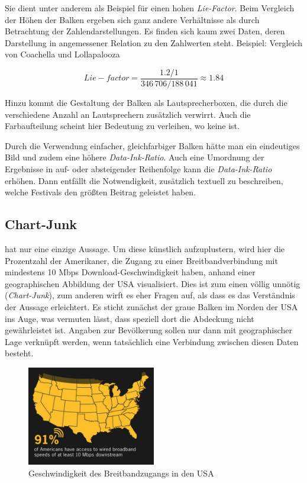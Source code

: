 \documentclass[a4paper,12pt,ngerman]{scrartcl}
\begin{document}
Sie dient unter anderem als Beispiel für einen hohen \emph{Lie-Factor}. Beim Vergleich der Höhen der Balken ergeben sich ganz andere Verhältnisse als durch Betrachtung der  Zahlendarstellungen. Es finden sich kaum zwei Daten, deren Darstellung in angemessener Relation zu den Zahlwerten steht.
Beispiel: Vergleich von Coachella und Lollapalooza

\begin{equation}
    Lie-factor = \frac{1.2 / 1}{346\,706 / 188\,041} \approx 1.84
\end{equation}

Hinzu kommt die Gestaltung der Balken als Lautsprecherboxen, die durch die verschiedene Anzahl an Lautsprechern zusätzlich verwirrt. Auch die Farbaufteilung scheint hier Bedeutung zu verleihen, wo keine ist.

Durch die Verwendung einfacher, gleichfarbiger Balken hätte man ein eindeutiges Bild und zudem eine höhere \emph{Data-Ink-Ratio}. Auch eine Umordnung der Ergebnisse in auf- oder absteigender Reihenfolge kann die \emph{Data-Ink-Ratio} erhöhen. Dann entfällt die Notwendigkeit, zusätzlich textuell zu beschreiben, welche Festivals den größten Beitrag geleistet haben.

\subsection*{Chart-Junk}

 hat nur eine einzige Aussage. Um diese künstlich aufzuplustern, wird hier die Prozentzahl der Amerikaner, die Zugang zu einer Breitbandverbindung mit mindestens 10 Mbps Download-Geschwindigkeit haben, anhand einer geographischen Abbildung der USA visualisiert. Dies ist zum einen völlig unnötig (\emph{Chart-Junk}), zum anderen wirft es eher Fragen auf, als dass es das Verständnis der Aussage erleichtert. Es sticht zunächst der graue Balken im Norden der USA ins Auge, was vermuten lässt, dass speziell dort die Abdeckung nicht gewährleistet ist. Angaben zur Bevölkerung sollen nur dann mit geographischer Lage verknüpft werden, wenn tatsächlich eine Verbindung zwischen diesen Daten besteht.

\begin{figure}[ht]
    \centering
    \includegraphics[width=0.5\textwidth]{includes/usa}
    \caption{Geschwindigkeit des Breitbandzugangs in den USA}
    \label{usa}
\end{figure}
\end{document}
